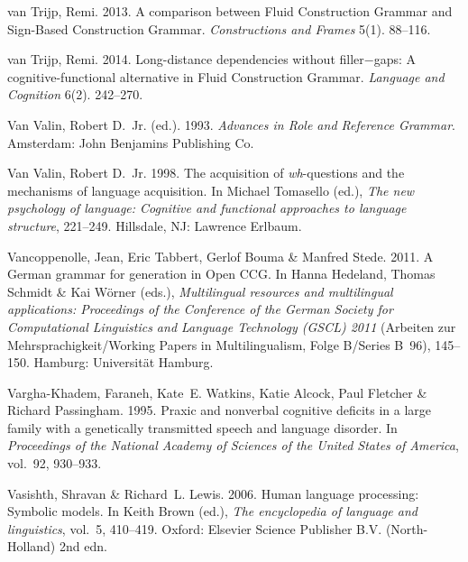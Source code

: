 \begin{thebibliography}{1420}
{van Trijp}, Remi. 2013.
\newblock A comparison between {Fluid Construction Grammar} and {Sign-Based
  Construction Grammar}.
\newblock \emph{Constructions and Frames} 5(1). 88--116.

{van Trijp}, Remi. 2014.
\newblock Long-distance dependencies without filler−gaps: {A}
  cognitive-functional alternative in {Fluid Construction Grammar}.
\newblock \emph{Language and Cognition} 6(2). 242--270.

{Van Valin}, Robert D.~Jr. (ed.). 1993.
\newblock \emph{Advances in {Role and Reference Grammar}}.
\newblock Amsterdam: John Benjamins Publishing Co.

{Van Valin}, Robert D.~Jr. 1998.
\newblock The acquisition of \emph{wh}-questions and the mechanisms of language
  acquisition.
\newblock In Michael Tomasello (ed.), \emph{The new psychology of language:
  {Cognitive} and functional approaches to language structure}, 221--249.
  Hillsdale, NJ: Lawrence Erlbaum.

Vancoppenolle, Jean, Eric Tabbert, Gerlof Bouma \& Manfred Stede. 2011.
\newblock A {German} grammar for generation in {Open CCG}.
\newblock In Hanna Hedeland, Thomas Schmidt \& Kai W{\"o}rner (eds.),
  \emph{Multilingual resources and multilingual applications: {Proceedings} of
  the {Conference of the German Society for Computational Linguistics and
  Language Technology (GSCL)} 2011} (Arbeiten zur Mehrsprachigkeit/Working
  Papers in Multilingualism, Folge B/Series B~96), 145--150. Hamburg:
  Universit{\"a}t Hamburg.

Vargha-Khadem, Faraneh, Kate~E. Watkins, Katie Alcock, Paul Fletcher \& Richard
  Passingham. 1995.
\newblock Praxic and nonverbal cognitive deficits in a large family with a
  genetically transmitted speech and language disorder.
\newblock In \emph{Proceedings of the {National Academy of Sciences of the
  United States of America}}, vol.~92, 930--933.

Vasishth, Shravan \& Richard~L. Lewis. 2006.
\newblock Human language processing: {Symbolic} models.
\newblock In Keith Brown (ed.), \emph{The encyclopedia of language and
  linguistics}, vol.~5, 410--419. Oxford: Elsevier Science Publisher B.V.
  (North-Holland) 2nd edn.


\end{thebibliography}
